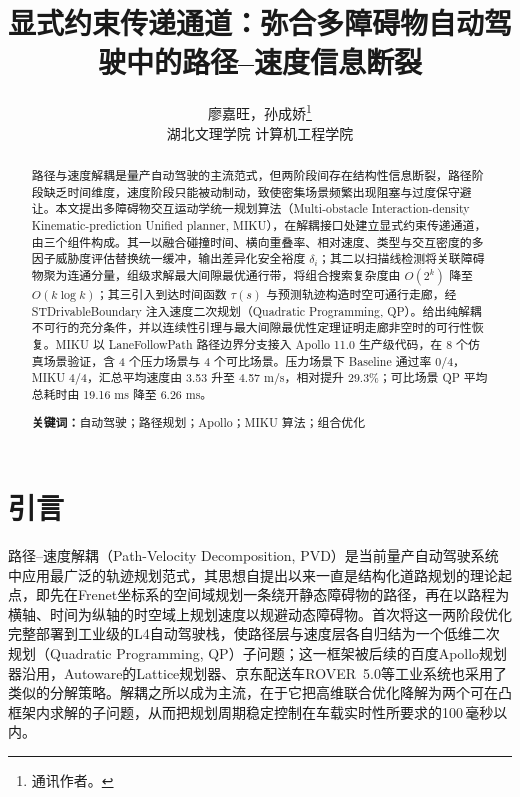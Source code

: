 \documentclass[a4paper,11pt]{ctexart}
\title{显式约束传递通道：弥合多障碍物自动驾驶中的路径--速度信息断裂}
\author{廖嘉旺，孙成娇\thanks{通讯作者。}\\[2pt]\normalsize 湖北文理学院 计算机工程学院}
\date{}
\theoremstyle{definition}
\begin{document}
\maketitle

\begin{abstract}
\noindent
路径与速度解耦是量产自动驾驶的主流范式，但两阶段间存在结构性信息断裂，路径阶段缺乏时间维度，速度阶段只能被动制动，致使密集场景频繁出现阻塞与过度保守避让。本文提出多障碍物交互运动学统一规划算法（Multi-obstacle Interaction-density Kinematic-prediction Unified planner, MIKU），在解耦接口处建立显式约束传递通道，由三个组件构成。其一以融合碰撞时间、横向重叠率、相对速度、类型与交互密度的多因子威胁度评估替换统一缓冲，输出差异化安全裕度 $\delta_i$；其二以扫描线检测将关联障碍物聚为连通分量，组级求解最大间隙最优通行带，将组合搜索复杂度由 $O(2^k)$ 降至 $O(k\log k)$；其三引入到达时间函数 $\tau(s)$ 与预测轨迹构造时空可通行走廊，经 STDrivableBoundary 注入速度二次规划（Quadratic Programming, QP）。给出纯解耦不可行的充分条件，并以连续性引理与最大间隙最优性定理证明走廊非空时的可行性恢复。MIKU 以 LaneFollowPath 路径边界分支接入 Apollo 11.0 生产级代码，在 8 个仿真场景验证，含 4 个压力场景与 4 个可比场景。压力场景下 Baseline 通过率 0/4，MIKU 4/4，汇总平均速度由 3.53 升至 4.57 m/s，相对提升 29.3\%；可比场景 QP 平均总耗时由 19.16 ms 降至 6.26 ms。

\vspace{0.5em}
\noindent\textbf{关键词：}自动驾驶；路径规划；Apollo；MIKU 算法；组合优化
\end{abstract}
\section{引言}
\label{sec:intro}

路径--速度解耦（Path-Velocity Decomposition, PVD）是当前量产自动驾驶系统中应用最广泛的轨迹规划范式，其思想自\citet{kant1986pvd}提出以来一直是结构化道路规划的理论起点，即先在Frenet坐标系的空间域规划一条绕开静态障碍物的路径，再在以路程为横轴、时间为纵轴的时空域上规划速度以规避动态障碍物。\citet{fan2018baidu}首次将这一两阶段优化完整部署到工业级的L4自动驾驶栈，使路径层与速度层各自归结为一个低维二次规划（Quadratic Programming, QP）子问题；这一框架被后续的百度Apollo规划器\citep{apollo2024}沿用，Autoware的Lattice规划器、京东配送车ROVER~5.0\citep{wang2022_jfr}等工业系统也采用了类似的分解策略。解耦之所以成为主流，在于它把高维联合优化降解为两个可在凸框架内求解的子问题，从而把规划周期稳定控制在车载实时性所要求的100\,毫秒以内\citep{fan2018baidu}。
\end{document}
